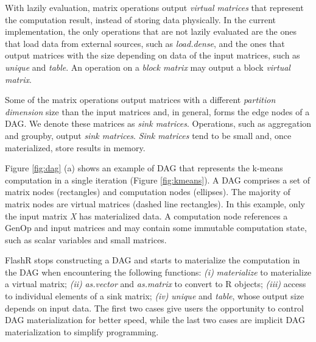 With lazily evaluation, matrix operations
output \textit{virtual matrices} that represent the computation result,
instead of storing data physically. In the current implementation,
the only operations that are not lazily evaluated are the ones that
load data from external sources, such as \textit{load.dense}, and the ones
that output matrices
with the size depending on data of the input matrices, such as \textit{unique}
and \textit{table}. An operation on a \textit{block matrix} may output
a block \textit{virtual matrix}.


Some of the matrix operations output matrices with
a different \textit{partition dimension} size than the input matrices and,
in general, forms the edge nodes of a DAG. We denote these matrices as
\textit{sink matrices}. Operations, such as aggregation and groupby,
output \textit{sink matrices}. \textit{Sink matrices} tend to be small and,
once materialized, store results in memory.

Figure \ref{fig:dag} (a) shows an example of DAG that represents the k-means
computation in a single iteration (Figure \ref{fig:kmeans}).
A DAG comprises a set of
matrix nodes (rectangles) and computation nodes (ellipses). The majority of
matrix nodes are virtual matrices (dashed line rectangles).
In this example, only the input matrix \textit{X} has materialized data.
A computation node references a GenOp and input matrices and
may contain some immutable computation state, such as scalar variables and
small matrices. 

FlashR stops constructing a DAG and starts to materialize the computation
in the DAG when encountering the following functions: \textit{(i)}
\textit{materialize} to materialize a virtual matrix;
\textit{(ii)} \textit{as.vector} and \textit{as.matrix} to convert
to R objects; \textit{(iii)} access to individual elements of a sink matrix;
\textit{(iv)} \textit{unique} and \textit{table},
whose output size depends on input data. The first two cases
give users the opportunity to control DAG materialization for better speed,
while the last two cases are implicit DAG materialization to simplify programming.

